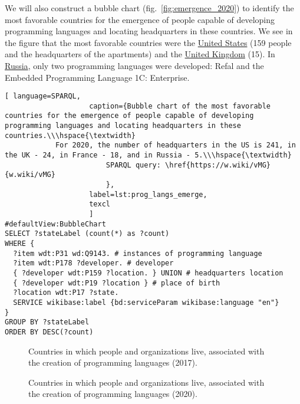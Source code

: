 We will also construct a bubble chart (fig.~\ref{fig:emergence_2020}) to identify the most favorable countries for the emergence of people capable of developing programming languages and locating headquarters in these countries. We see in the figure that the most favorable countries were the \href{https://en.wikipedia.org/wiki/United_States}{United States} (159 people and the headquarters of the apartments) and the \href{https://en.wikipedia.org/wiki/United_Kingdom}{United Kingdom} (15). In \href{https://en.wikipedia.org/wiki/Russia}{Russia}, only two programming languages were developed: Refal and the Embedded Programming Language 1C: Enterprise.

\begin{lstlisting}[ language=SPARQL, 
                    caption={Bubble chart of the most favorable countries for the emergence of people capable of developing programming languages and locating headquarters in these countries.\\\hspace{\textwidth}
			For 2020, the number of headquarters in the US is 241, in the UK - 24, in France - 18, and in Russia - 5.\\\hspace{\textwidth}
                        SPARQL query: \href{https://w.wiki/vMG}{w.wiki/vMG}
                        },
                    label=lst:prog_langs_emerge,
                    texcl 
                    ]
#defaultView:BubbleChart
SELECT ?stateLabel (count(*) as ?count)
WHERE {
  ?item wdt:P31 wd:Q9143. # instances of programming language
  ?item wdt:P178 ?developer. # developer
  { ?developer wdt:P159 ?location. } UNION # headquarters location
  { ?developer wdt:P19 ?location } # place of birth
  ?location wdt:P17 ?state.
  SERVICE wikibase:label {bd:serviceParam wikibase:language "en"} 	
}
GROUP BY ?stateLabel
ORDER BY DESC(?count)
\end{lstlisting}%

\begin{figure*}[h]
{
\setlength{\fboxsep}{0pt}%
\setlength{\fboxrule}{1pt}%
}
	\caption{Countries in which people and organizations live, associated with the creation of programming languages (2017).}
	\label{fig:organizations_2017}
\end{figure*}
\begin{figure*}[h]
{
\setlength{\fboxsep}{0pt}%
\setlength{\fboxrule}{1pt}%
}
	\caption{Countries in which people and organizations live, associated with the creation of programming languages (2020).}
	\label{fig:organizations_2020}
\end{figure*}

